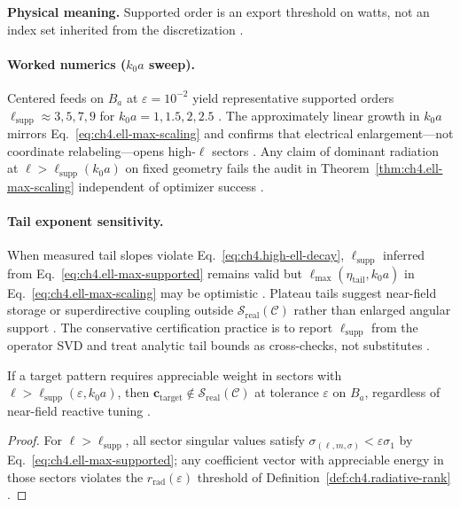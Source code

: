 \textbf{Physical meaning.} Supported order is an export threshold on watts, not an index set inherited from the discretization
\cite{hansen1988,harrington2001}.

\paragraph{Worked numerics (\(k_{0}a\) sweep).}
Centered feeds on \(B_{a}\) at \(\varepsilon=10^{-2}\) yield representative supported orders
\(\ell_{\mathrm{supp}}\approx3,5,7,9\) for \(k_{0}a=1,1.5,2,2.5\) \cite{hansen1988,harrington2001,jackson1999}. The approximately
linear growth in \(k_{0}a\) mirrors Eq.~\eqref{eq:ch4.ell-max-scaling} and confirms that electrical enlargement---not coordinate
relabeling---opens high-\(\ell\) sectors \cite{stratton1941,devaney2004}. Any claim of dominant radiation at
\(\ell>\ell_{\mathrm{supp}}(k_{0}a)\) on fixed geometry fails the audit in Theorem~\ref{thm:ch4.ell-max-scaling} independent of
optimizer success \cite{hansen1988}.

\paragraph{Tail exponent sensitivity.}
When measured tail slopes violate Eq.~\eqref{eq:ch4.high-ell-decay}, \(\ell_{\mathrm{supp}}\) inferred from Eq.~\eqref{eq:ch4.ell-max-supported}
remains valid but \(\ell_{\max}(\eta_{\mathrm{tail}},k_{0}a)\) in Eq.~\eqref{eq:ch4.ell-max-scaling} may be optimistic
\cite{hansen1988,harrington2001}. Plateau tails suggest near-field storage or superdirective coupling outside
\(\mathcal{S}_{\mathrm{real}}(\mathcal{C})\) rather than enlarged angular support \cite{devaney2004,stratton1941,collin2001}. The conservative
certification practice is to report \(\ell_{\mathrm{supp}}\) from the operator SVD and treat analytic tail bounds as cross-checks, not
substitutes \cite{hansen1988,jackson1999}.

\begin{theorem}
\label{thm:ch4.ell-supp-superdirective}
If a target pattern requires appreciable weight in sectors with \(\ell>\ell_{\mathrm{supp}}(\varepsilon,k_{0}a)\), then
\(\mathbf{c}_{\mathrm{target}}\notin\mathcal{S}_{\mathrm{real}}(\mathcal{C})\) at tolerance \(\varepsilon\) on \(B_{a}\), regardless of
near-field reactive tuning \cite{devaney2004,hansen1988,harrington2001,stratton1941}.
\end{theorem}
\begin{proof}
For \(\ell>\ell_{\mathrm{supp}}\), all sector singular values satisfy \(\sigma_{(\ell,m,\sigma)}<\varepsilon\sigma_{1}\) by
Eq.~\eqref{eq:ch4.ell-max-supported}; any coefficient vector with appreciable energy in those sectors violates the
\(r_{\mathrm{rad}}(\varepsilon)\) threshold of Definition~\ref{def:ch4.radiative-rank} \cite{harrington2001,devaney2004}.
\end{proof}

